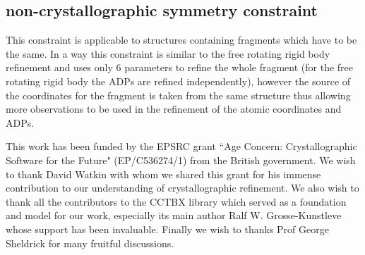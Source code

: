 \documentclass[pdf]{iucr}
\begin{document}
\subsection{non-crystallographic symmetry constraint}
This constraint is applicable to structures containing fragments which have to be the same. In a way this constraint is similar to the free rotating rigid body refinement and uses only 6 parameters to refine the whole fragment (for the free rotating rigid body the ADPs are refined independently), however the source of the coordinates for the fragment is taken from the same structure thus allowing more observations to be used in the refinement of the atomic coordinates and ADPs. 


This work has been funded by the EPSRC grant ``Age Concern: Crystallographic Software for the Future" (EP/C536274/1) from the British government. We wish to thank David Watkin with whom we shared this grant for his immense contribution to our understanding of crystallographic refinement. We also wish to thank all the contributors to the CCTBX library which served as a foundation and model for our work, especially its main author Ralf W. Grosse-Kunstleve whose support has been invaluable. Finally we wish to thanks Prof George Sheldrick for many fruitful discussions.

\end{document}
